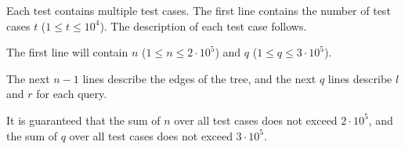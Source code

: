 Each test contains multiple test cases. The first line contains the number of test cases
$t$ ($1 \leq t \leq 10^4$). The description of each test case follows.

The first line will contain $n$ ($1 \leq n \leq 2 \cdot 10^5$) and $q$ ($1 \leq q \leq 3 \cdot 10^5$).

The next $n - 1$ lines describe the edges of the tree, and the next $q$ lines describe $l$ and $r$ for each query.

It is guaranteed that the sum of $n$ over all test cases does not exceed $2 \cdot 10^5$,
and the sum of $q$ over all test cases does not exceed $3 \cdot 10^5$.
